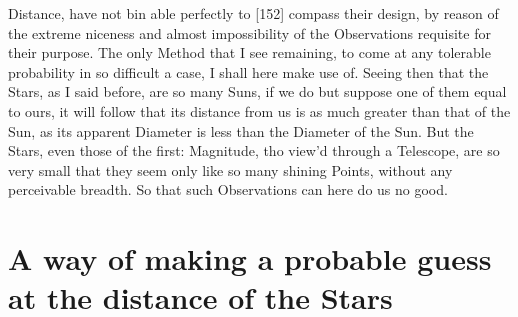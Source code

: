 \documentclass[letterpaper]{book}
\begin{document}
Distance, have not bin able perfectly to [152] compass their design, by
reason of the extreme niceness and almost impossibility of the Observations
requisite for their purpose. The only Method that I see remaining, to come
at any tolerable probability in so difficult a case, I shall here make use
of. Seeing then that the Stars, as I said before, are so many Suns, if we do
but suppose one of them equal to ours, it will follow that its distance from
us is as much greater than that of the Sun, as its apparent Diameter is less
than the Diameter of the Sun. But the Stars, even those of the first:
Magnitude, tho view'd through a Telescope, are so very small that they seem
only like so many shining Points, without any perceivable breadth. So that
such Observations can here do us no good.


\section{A way of making a probable guess at the distance of the Stars}
\end{document}
